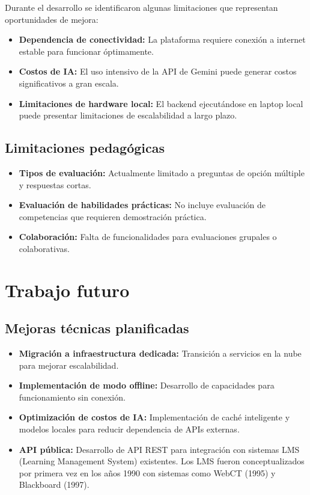 \documentclass[12pt,a4paper]{report}
\begin{document}
Durante el desarrollo se identificaron algunas limitaciones que representan oportunidades de mejora:

\begin{itemize}
\item \textbf{Dependencia de conectividad:} La plataforma requiere conexión a internet estable para funcionar óptimamente.

\item \textbf{Costos de IA:} El uso intensivo de la API de Gemini puede generar costos significativos a gran escala.

\item \textbf{Limitaciones de hardware local:} El backend ejecutándose en laptop local puede presentar limitaciones de escalabilidad a largo plazo.
\end{itemize}

\subsection{Limitaciones pedagógicas}

\begin{itemize}
\item \textbf{Tipos de evaluación:} Actualmente limitado a preguntas de opción múltiple y respuestas cortas.

\item \textbf{Evaluación de habilidades prácticas:} No incluye evaluación de competencias que requieren demostración práctica.

\item \textbf{Colaboración:} Falta de funcionalidades para evaluaciones grupales o colaborativas.
\end{itemize}

\section{Trabajo futuro}

\subsection{Mejoras técnicas planificadas}

\begin{itemize}
\item \textbf{Migración a infraestructura dedicada:} Transición a servicios en la nube para mejorar escalabilidad.

\item \textbf{Implementación de modo offline:} Desarrollo de capacidades para funcionamiento sin conexión.

\item \textbf{Optimización de costos de IA:} Implementación de caché inteligente y modelos locales para reducir dependencia de APIs externas.

\item \textbf{API pública:} Desarrollo de API REST para integración con sistemas LMS (Learning Management System) existentes. Los LMS fueron conceptualizados por primera vez en los años 1990 con sistemas como WebCT (1995) y Blackboard (1997).
\end{itemize}
\end{document}
